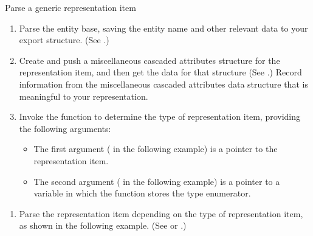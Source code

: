 \documentclass[letterpaper,12pt,english,openany,oneside]{sphinxmanual}
\begin{document}
Parse a generic representation item
\begin{enumerate}
%
\item {} 
Parse the entity base, saving the entity name and other relevant data to your export structure. (See .)

\item {} 
Create and push a miscellaneous cascaded attributes structure for the representation item, and then get the data for that structure (See .) Record information from the miscellaneous cascaded attributes data structure that is meaningful to your representation.

\item {} 
Invoke the  function to determine the type of representation item, providing the following arguments:
\begin{itemize}
\item {} 
The first argument ( in the following example) is a pointer to the representation item.

\item {} 
The second argument ( in the following example) is a pointer to a variable in which the function stores the type enumerator.

\end{itemize}

\end{enumerate}

\begin{sphinxVerbatim}[commandchars=\\\{\}]
 
    
\end{sphinxVerbatim}
\begin{enumerate}
%
\setcounter{enumi}{3}
\item {} 
Parse the representation item depending on the type of representation item, as shown in the following example. (See  or .)

\end{enumerate}
\end{document}
